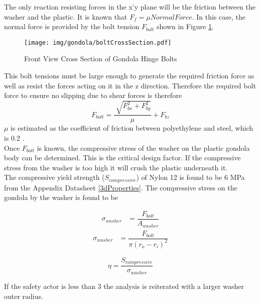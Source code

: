 \documentclass[../main.tex]{subfiles}
\begin{document}
The only reaction resisting forces in the x'y plane will be the friction between the washer and the plastic. It is known that $F_f = \mu Normal Force$. In this case, the normal force is provided by the bolt tension $F_{bolt}$ shown in Figure \ref{fig:boltCrossSection}. 
\begin{figure}[H]
	\centering
	\texttt{[image: img/gondola/boltCrossSection.pdf]}
	\caption{Front View Cross Section of Gondola Hinge Bolts}
	\label{fig:boltCrossSection}
\end{figure}
This bolt tensions must be large enough to generate the required friction force as well as resist the forces acting on it in the z direction. Therefore the required bolt force to ensure no slipping due to shear forces is therefore
\begin{equation}
F_{bolt} = \dfrac{\sqrt[]{F_{bx}^2 + F_{by}^2}}{\mu} + F_{bz}
\end{equation}
$\mu $ is estimated as the coefficient of friction between polyethylene and steel, which is 0.2 \cite{Friction}. \\

Once $F_{bolt}$ is known, the compressive stress of the washer on the plastic gondola body can be determined. This is the critical design factor. If the compressive stress from the washer is too high it will crush the plastic underneath it.\\

The compressive yield strength ($S_{compressive}$) of Nylon 12  is found to be 6 MPa from the Appendix Datasheet \ref{3dProperties}. The compressive stress on the gondola by the washer is found to be 

\begin{align*}
\sigma _{washer} &= \dfrac{F_{bolt}}{A_{washer}}
\end{align*}
\begin{align}
\sigma _{washer} &= \dfrac{F_{bolt}}{\pi (r_o - r_i)^2}
\end{align}

\begin{equation}
\eta = \dfrac{S_{compressive}}{\sigma _{washer}}
\end{equation}

If the safety actor is less than 3 the analysis is reiterated with a larger washer outer radius. 
\end{document}

